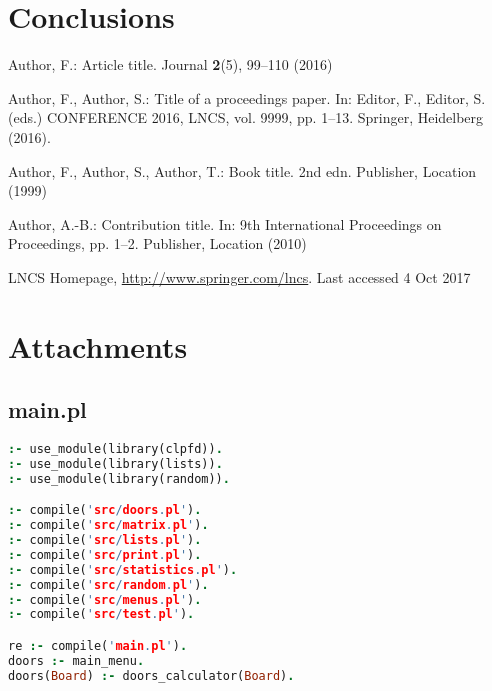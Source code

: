 \documentclass[runningheads]{llncs}
\begin{document}
\section{Conclusions}
\label{sec:conclusions}

%
%
%
% 
% 
%
\begin{thebibliography}{8}
	Author, F.: Article title. Journal \textbf{2}(5), 99--110 (2016)
	
	Author, F., Author, S.: Title of a proceedings paper. In: Editor,
	F., Editor, S. (eds.) CONFERENCE 2016, LNCS, vol. 9999, pp. 1--13.
	Springer, Heidelberg (2016). 
	
	Author, F., Author, S., Author, T.: Book title. 2nd edn. Publisher,
	Location (1999)
	
	Author, A.-B.: Contribution title. In: 9th International Proceedings
	on Proceedings, pp. 1--2. Publisher, Location (2010)
	
	LNCS Homepage, \url{http://www.springer.com/lncs}. Last accessed 4
	Oct 2017
\end{thebibliography}

\newpage

\section{Attachments}
\label{sec:attachments}

\subsection{main.pl}

\begin{center}
\begin{minipage}{0.85\textwidth}
\centering\ttfamily
\begin{lstlisting}[language=Prolog]
:- use_module(library(clpfd)).
:- use_module(library(lists)).
:- use_module(library(random)).

:- compile('src/doors.pl').
:- compile('src/matrix.pl').
:- compile('src/lists.pl').
:- compile('src/print.pl').
:- compile('src/statistics.pl').
:- compile('src/random.pl').
:- compile('src/menus.pl').
:- compile('src/test.pl').

re :- compile('main.pl').
doors :- main_menu.
doors(Board) :- doors_calculator(Board).

\end{lstlisting}
\end{minipage}
\end{center}
\end{document}
